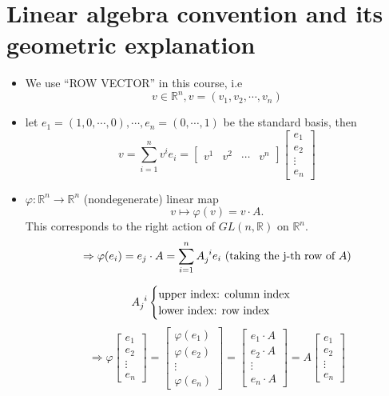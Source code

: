 \documentclass[UTF8,oneside,11pt]{book}
\theoremstyle{plain}\newtheorem{thm}{Theorem}
\theoremstyle{definition}\newtheorem{defn}[thm]{Definition}
\theoremstyle{plain}\newtheorem{axiom}[thm]{Axiom}
\theoremstyle{plain}\newtheorem{coro}[thm]{Corollary}
\theoremstyle{plain}\newtheorem{lemma}[thm]{Lemma}
\theoremstyle{plain}\newtheorem{prop}[thm]{Proposition}
\theoremstyle{plain}\newtheorem{conj}[thm]{Conjecture}
\theoremstyle{plain}\newtheorem{ques}[thm]{Problem}
\theoremstyle{plain}\newtheorem{const}[thm]{Construction}
\theoremstyle{remark}\newtheorem{notation}[thm]{Notation}
\theoremstyle{plain}\newtheorem*{app}{Application}
\theoremstyle{plain}\newtheorem*{exam}{Example}
\theoremstyle{plain}\newtheorem*{exer}{Exercise}
\theoremstyle{remark}\newtheorem*{remark}{Remark}
\theoremstyle{remark}\newtheorem*{note}{\small{Note}}
\numberwithin{equation}{section}
\numberwithin{thm}{section}
\begin{document}
\section{Linear algebra convention and its geometric explanation}
\begin{itemize}
    \item We use ``ROW VECTOR'' in this course, i.e
    \[v\in \mathbb{R}^n, v=(v_1,v_2,\cdots,v_n)\]
    \item let $e_1=(1,0,\cdots,0),\cdots,e_n=(0,\cdots,1)$ be the standard basis, then 
    \[v=\sum_{i=1}^nv^i e_i=
    \begin{bmatrix}
        v^1& v^2& \cdots & v^n
    \end{bmatrix}
    \begin{bmatrix}
        e_1\\
        e_2\\
        \vdots\\
        e_n
    \end{bmatrix}
    \]
    \item $\varphi\colon \mathbb{R}^n\to \mathbb{R}^n$ (nondegenerate) linear map
    \[v\mapsto \varphi(v)=v\cdot A.\]
    This corresponds to the right action of $GL(n,\mathbb{R})$ on $\mathbb{R}^n$.
    \[\Rightarrow \varphi(e_i)=e_j \cdot A=\sum_{i=1}^n A\indices{_j^i}e_i\text{ (taking the j-th row of }A\text{)}\]
    
    \[A\indices{_j^i}\begin{cases}
        \text{upper index: column index}\\
        \text{lower index: row index}
    \end{cases}\]
    \[\Rightarrow \varphi\begin{bmatrix}
        e_1\\
        e_2\\
        \vdots\\
        e_n
    \end{bmatrix}=\begin{bmatrix}
       \varphi( e_1)\\
        \varphi (e_2)\\
        \vdots\\
        \varphi(e_n)
    \end{bmatrix}=\begin{bmatrix}
        e_1\cdot A\\
        e_2\cdot A\\
        \vdots\\
        e_n\cdot A
    \end{bmatrix}=
    A \begin{bmatrix}
        e_1\\
        e_2\\
        \vdots\\
        e_n
    \end{bmatrix}\]
\end{itemize}
\end{document}
